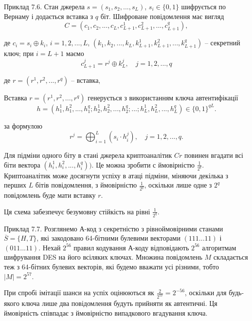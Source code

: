 \begin{example}
    Приклад 7.6. Стан джерела $s = (s_1, s_2, ..., s_L)$, $s_i \in \{0, 1\}$ шифрується по
    Вернаму і додається вставка з $q$ біт. Шифроване повідомлення має вигляд
    \begin{equation*}
        C = (c_1, c_2, ..., c_L, c_{L + 1}^1, c_{L + 1}^2, ..., c_{L + 1}^q),
    \end{equation*}
    
    де $c_i = s_i \oplus k_i$, $i = 1, 2, ..., L$,
    $(k_1, k_2, ..., k_L, k_{L + 1}^1, k_{L + 1}^2, ..., k_{L + 1}^q)$ -- секретний ключ;
    при $i = L + 1$ маємо
    \begin{equation*}
        c_{L + 1}^j = r^j \oplus k_L^j, \quad j = 1, 2, ..., q
    \end{equation*}
    
    де $r = (r^1, r^2, ..., r^q)$ -- вставка,
    
    Вставка $r = (r^1, r^2, ..., r^q)$ генерується з використанням ключа
    автентифікації
    \begin{equation*}
        h = (h_1^1, h_1^2, ..., h_1^q; h_2^1, h_2^2, ..., h_2^q; ...; h_L^1, h_L^2, ..., h_L^q) \in \{0, 1\}^{qL}.
    \end{equation*}
    
    за формулою
    \begin{equation*}
        r^j = \bigoplus_{i = 1}^L (s_i \cdot h_i^j), \quad j = 1, 2, ..., q.
    \end{equation*}
    
    Для підміни одного біту в стані джерела криптоаналітик $Cr$ повинен вгадати
    всі біти вектора $(h_i^1, h_i^2, ..., h_i^q))$. Це можна зробити с ймовірністю $\frac{1}{2^q}$.
    Криптоаналітик може досягнути успіху в атаці підміни, міняючи декілька з
    перших $L$ бітів повідомлення, з ймовірністю $\frac{1}{2^q}$, оскільки лише одне з $2^q$
    повідомлень буде мати вставку $r$.
    
    Ця схема забезпечує безумовну стійкість на рівні $\frac{1}{2^q}$.
\end{example}

\begin{example}
    Приклад 7.7. Розглянемо А-код з секретністю з рівноймовірними станами $\overline{S} = \{H, T\}$,
    які закодовано 64-бітними булевими векторами $(111...11)$ і $(011...11)$.
    Нехай $2^{56}$ правил кодування А-коду відповідають $2^{56}$ алгоритмам
    шифрування DES на його всіляких ключах. Множина повідомлень $M$
    складається теж з 64-бітних булевих векторів, які будемо вважати усі різними,
    тобто $|M| = 2^{57}$.
    
    При спробі імітації шанси на успіх оцінюються як $\frac{2}{2^{57}} = 2^{-56}$, оскільки
    для будь-якого ключа лише два повідомлення будуть прийняти як автентичні.
    Ця ймовірність співпадає з ймовірністю випадкового вгадування ключа.
\end{example}

